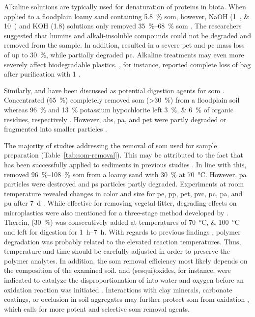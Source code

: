 Alkaline solutions are typically used for denaturation of proteins in biota. When applied to a floodplain loamy sand containing \SI{5.8}{\percent} \ac{som},
however, NaOH (\SIlist{1;10}{\Molar}) and KOH (\SI{1.8}{\Molar}) solutions only removed
\SIrange{35}{68}{\percent} \ac{som} \citep{HurleyValidation2018}. The researchers suggested that humins and alkali-insoluble compounds could not be degraded and removed from the sample. In addition,  resulted in a severe \ac{pet} and \ac{pc} mass loss of up to \SI{30}{\percent}, while  partially degraded \ac{pc}. Alkaline treatments may even more severely affect biodegradable plastics. ,
for instance, reported complete loss of  bag after purification with \SI{1}{\Molar} .

Similarly,  and  have been discussed as potential digestion agents for \ac{som} \citep{BlasingPlastics2018}. Concentrated
 (\SI{65}{\percent}) completely removed \ac{som} (\SI{>30}{\percent})
from a floodplain soil whereas \SI{96}{\percent}
 and \SI{13}{\percent} potassium hypochlorite left \SIlist{3;6}{\percent} of organic residues,
respectively \citep{ScheurerMicroplastics2018}. However, \ac{abs}, \ac{pa}, and \ac{pet} were partly degraded or fragmented into smaller particles \citep{ScheurerMicroplastics2018}.

The majority of studies addressing the removal of \ac{som} used  for sample preparation
(Table~\ref{tab:som-removal}). This may be attributed to the fact that  has been successfully applied to sediments in previous studies \citep{NuelleNew2014,ImhofNovel2012}. In line with this, \citet{HurleyValidation2018}
removed \SIrange{96}{108}{\percent} \ac{som} from a loamy sand with \SI{30}{\percent}
 at \SI{70}{\degreeCelsius}. However, \ac{pa} particles were destroyed and \ac{ps} particles partly degraded. Experiments at room temperature revealed changes in color and size for \ac{pe}, \ac{pp}, \ac{pet}, \ac{pvc},
\ac{pc}, \ac{pa}, and \ac{pu} after \SI{7}{\day} \citep{NuelleNew2014}. While effective for removing vegetal litter, degrading effects on microplastics were also mentioned for a three-stage method developed by \citet{DuanDevelopment2020}.
Therein,  (\SI{30}{\percent}) was consecutively added at temperatures of \SIlist{70;100}{\degreeCelsius} and left for digestion for \SIrange{1}{7}{\hour}. With regards to previous findings \citep{HurleyValidation2018}, polymer degradation was probably related to the elevated reaction temperatures. Thus, temperature and time should be carefully adjusted in order to preserve the polymer analytes. In addition, the \ac{som} removal efficiency most likely depends on the composition of the examined soil.  and  (sesqui)oxides, for instance,
were indicated to catalyze the disproportionation of
 into water and oxygen before an oxidation reaction was initiated \citep{PetigaraMechanisms2002}. Interactions with clay minerals, carbonate coatings, or occlusion in soil aggregates may further protect \ac{som} from oxidation \citep{MikuttaOrganic2005}, which calls for more potent and selective \ac{som} removal agents.

